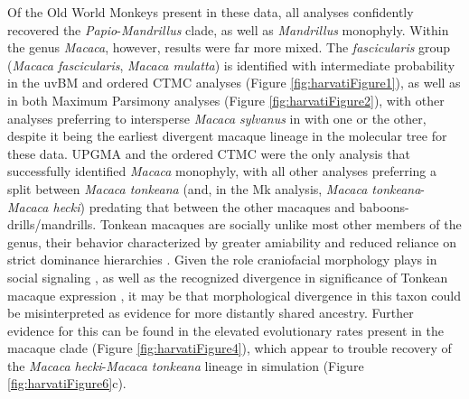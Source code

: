 \documentclass[10pt, twocolumn, twoside]{article}
\begin{document}
Of the Old World Monkeys present in these data, all analyses confidently recovered the \textit{Papio}-\textit{Mandrillus} clade, as well as \textit{Mandrillus} monophyly. Within the genus \textit{Macaca}, however, results were far more mixed. The \textit{fascicularis} group (\textit{Macaca fascicularis}, \textit{Macaca mulatta}) is identified with intermediate probability in the uvBM and ordered CTMC analyses (Figure \ref{fig:harvatiFigure1}), as well as in both Maximum Parsimony analyses (Figure \ref{fig:harvatiFigure2}), with other analyses preferring to intersperse \textit{Macaca sylvanus} in with one or the other, despite it being the earliest divergent macaque lineage in the molecular tree for these data. UPGMA and the ordered CTMC were the only analysis that successfully identified \textit{Macaca} monophyly, with all other analyses preferring a split between \textit{Macaca tonkeana} (and, in the Mk analysis, \textit{Macaca tonkeana}-\textit{Macaca hecki}) predating that between the other macaques and baboons-drills/mandrills. Tonkean macaques are socially unlike most other members of the genus, their behavior characterized by greater amiability and reduced reliance on strict dominance hierarchies \citep{thierryPatternsAgonisticInteractions1985, thierryUnityDiversityLessons2007}. Given the role craniofacial morphology plays in social signaling \citep{brechtManyFacetsFacial2012}, as well as the recognized divergence in significance of Tonkean macaque expression \citep{thierryStructuralConvergenceSilent1989, pellisUseBaredteethDisplay2011}, it may be that morphological divergence in this taxon could be misinterpreted as evidence for more distantly shared ancestry. Further evidence for this can be found in the elevated evolutionary rates present in the macaque clade (Figure \ref{fig:harvatiFigure4}), which appear to trouble recovery of the \textit{Macaca hecki}-\textit{Macaca tonkeana} lineage in simulation (Figure \ref{fig:harvatiFigure6}c). 
\end{document}
